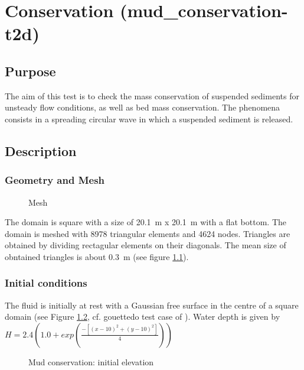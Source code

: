 \chapter{Conservation (mud\_conservation-t2d)}
%

%
\section{Purpose}
The aim of this test is to check the mass conservation of suspended sediments for unsteady flow conditions, as well as bed mass conservation. The phenomena consists in a spreading circular wave in which a suspended sediment is released.

\section{Description}

\subsection{Geometry and Mesh}
%
\begin{figure}[h]
\begin{center}
\end{center}
\caption{Mesh}
\label{fig:cons_mesh}
\end{figure}

The domain is square with a size of  20.1~m x 20.1~m with a flat bottom.
The domain is meshed with 8978 triangular elements and 4624 nodes. Triangles
are obtained by dividing rectagular elements on their diagonals. The mean size
of obntained triangles is about 0.3~m (see figure \ref{fig:cons_mesh}).
%
\subsection{Initial conditions}
%
The fluid is initially at rest with a Gaussian free surface in the centre of a
square domain (see Figure \ref{fig:water_init}, cf. gouettedo test case of  ). Water depth is given by
$ H= 2.4 \left(1.0+exp \left( \frac{-\left[ (x-10)^2+( y-10)^2\right]}{ 4}\right)\right) $

\begin{figure}[H]
\begin{center}
\end{center}
\caption{Mud conservation: initial elevation}
\label{fig:water_init}
\end{figure}

